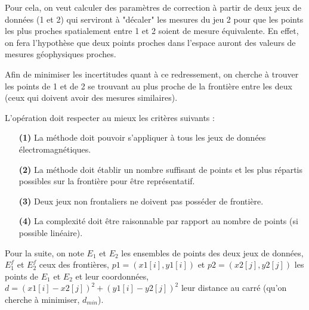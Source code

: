 \documentclass[12pt]{article}
\begin{document}
    Pour cela, on veut calculer des paramètres de correction à partir de deux jeux de données (1 et 2) qui serviront à "décaler" les mesures du jeu 2 pour que les points les plus proches spatialement entre 1 et 2 soient de mesure équivalente. En effet, on fera l'hypothèse que deux points proches dans l'espace auront des valeurs de mesures géophysiques proches.

    Afin de minimiser les incertitudes quant à ce redressement, on cherche à trouver les points de 1 et de 2 se trouvant au plus proche de la frontière entre les deux (ceux qui doivent avoir des mesures similaires).

    L'opération doit respecter au mieux les critères suivants :
    \begin{enumerate}
        \item[\textbf{(1)}] La méthode doit pouvoir s'appliquer à tous les jeux de données électromagnétiques.
        \item[\textbf{(2)}] La méthode doit établir un nombre suffisant de points et les plus répartis possibles sur la frontière pour être représentatif.
        \item[\textbf{(3)}] Deux jeux non frontaliers ne doivent pas posséder de frontière.
        \item[\textbf{(4)}] La complexité doit être raisonnable par rapport au nombre de points (si possible linéaire).
    \end{enumerate}

    Pour la suite, on note $E_1$ et $E_2$ les ensembles de points des deux jeux de données, $E_1^f$ et $E_2^f$ ceux des frontières, $p1 = (x1[i], y1[i])$ et $p2 = (x2[j], y2[j])$ les points de $E_1$ et $E_2$ et leur coordonnées, $d = (x1[i]-x2[j])^{2} + (y1[i]-y2[j])^{2}$ leur distance au carré (qu'on cherche à minimiser, $d_{min}$).\\
\end{document}
